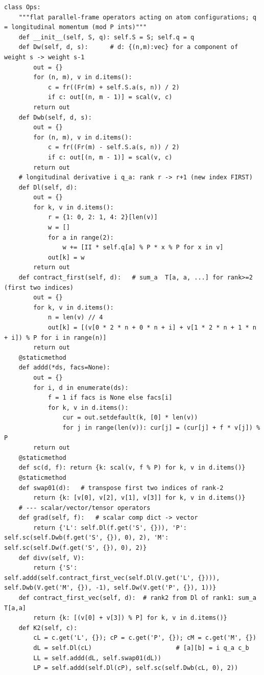 \documentclass[10pt]{article}
\begin{document}
\begin{lstlisting}
class Ops:
    """flat parallel-frame operators acting on atom configurations; q = longitudinal momentum (mod P ints)"""
    def __init__(self, S, q): self.S = S; self.q = q
    def Dw(self, d, s):      # d: {(n,m):vec} for a component of weight s -> weight s-1
        out = {}
        for (n, m), v in d.items():
            c = fr((Fr(m) + self.S.a(s, n)) / 2)
            if c: out[(n, m - 1)] = scal(v, c)
        return out
    def Dwb(self, d, s):
        out = {}
        for (n, m), v in d.items():
            c = fr((Fr(m) - self.S.a(s, n)) / 2)
            if c: out[(n, m - 1)] = scal(v, c)
        return out
    # longitudinal derivative i q_a: rank r -> r+1 (new index FIRST)
    def Dl(self, d):
        out = {}
        for k, v in d.items():
            r = {1: 0, 2: 1, 4: 2}[len(v)]
            w = []
            for a in range(2):
                w += [II * self.q[a] % P * x % P for x in v]
            out[k] = w
        return out
    def contract_first(self, d):   # sum_a  T[a, a, ...] for rank>=2 (first two indices)
        out = {}
        for k, v in d.items():
            n = len(v) // 4
            out[k] = [(v[0 * 2 * n + 0 * n + i] + v[1 * 2 * n + 1 * n + i]) % P for i in range(n)]
        return out
    @staticmethod
    def addd(*ds, facs=None):
        out = {}
        for i, d in enumerate(ds):
            f = 1 if facs is None else facs[i]
            for k, v in d.items():
                cur = out.setdefault(k, [0] * len(v))
                for j in range(len(v)): cur[j] = (cur[j] + f * v[j]) % P
        return out
    @staticmethod
    def sc(d, f): return {k: scal(v, f % P) for k, v in d.items()}
    @staticmethod
    def swap01(d):   # transpose first two indices of rank-2
        return {k: [v[0], v[2], v[1], v[3]] for k, v in d.items()}
    # --- scalar/vector/tensor operators
    def grad(self, f):   # scalar comp dict -> vector
        return {'L': self.Dl(f.get('S', {})), 'P': self.sc(self.Dwb(f.get('S', {}), 0), 2), 'M': self.sc(self.Dw(f.get('S', {}), 0), 2)}
    def divv(self, V):
        return {'S': self.addd(self.contract_first_vec(self.Dl(V.get('L', {}))), self.Dwb(V.get('M', {}), -1), self.Dw(V.get('P', {}), 1))}
    def contract_first_vec(self, d):  # rank2 from Dl of rank1: sum_a T[a,a]
        return {k: [(v[0] + v[3]) % P] for k, v in d.items()}
    def K2(self, c):
        cL = c.get('L', {}); cP = c.get('P', {}); cM = c.get('M', {})
        dL = self.Dl(cL)                       # [a][b] = i q_a c_b
        LL = self.addd(dL, self.swap01(dL))
        LP = self.addd(self.Dl(cP), self.sc(self.Dwb(cL, 0), 2))

\end{lstlisting}
\end{document}
